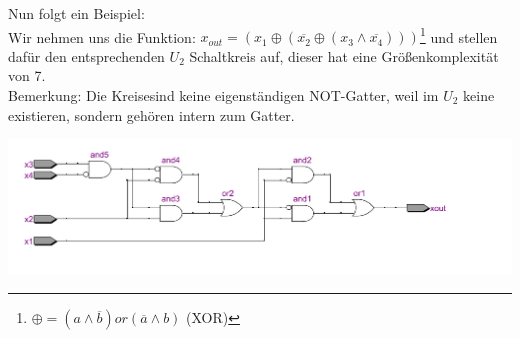 \documentclass[a4paper]{article}
\begin{document}


Nun folgt ein Beispiel: \\

Wir nehmen uns die Funktion: $x_{out} = (x_1 \oplus (\overline{x_2} \oplus (x_3 \wedge \overline{x_4})))$\footnote{$\oplus = (a \wedge \overline{b}) or (\overline{a} \wedge b)$ (XOR)} und
stellen daf\"ur den entsprechenden $U_2$ Schaltkreis auf, dieser hat eine Gr\"o\ss{}enkomplexit\"at von 7.\\
Bemerkung: Die \glqq Kreise\grqq \;sind keine eigenst\"andigen NOT-Gatter, weil im $U_2$ keine existieren, sondern geh\"oren intern zum Gatter.

\includegraphics[scale=0.50]{images/ursk.pdf}
\end{document}
